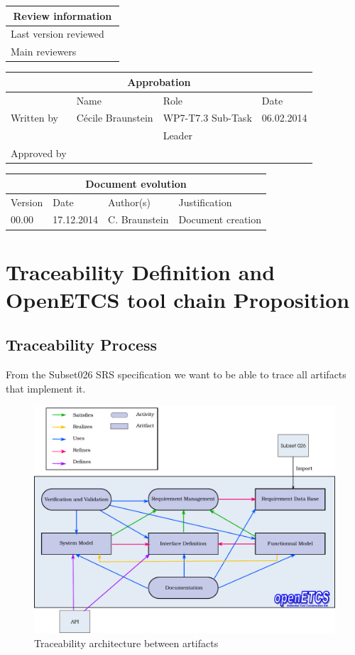 \documentclass[11pt]{template/openetcs_report}
\begin{document}
\begin{tabular}{|p{4.4cm}|p{8.7cm}|}
\hline
\multicolumn{2}{|c|}{Review information} \\
\hline
Last version reviewed &  \\
\hline
Main reviewers &  \\
\hline
\end{tabular}

\begin{tabular}{|p{2.2cm}|p{4cm}|p{4cm}|p{2cm}|}
\hline
\multicolumn{4}{|c|}{Approbation} \\
\hline
  &  Name & Role & Date   \\
\hline  
Written by    &  Cécile Braunstein & WP7-T7.3 Sub-Task  & 06.02.2014 \\
&  & Leader&\\
\hline
Approved by &  &   &  \\
\hline
\end{tabular}

\begin{tabular}{|p{2.2cm}|p{2cm}|p{3cm}|p{5cm}|}
\hline
\multicolumn{4}{|c|}{Document evolution} \\
\hline
Version &  Date & Author(s) & Justification  \\
\hline  
00.00 & 17.12.2014 & C. Braunstein  &  Document creation  \\


\hline  
\end{tabular}
\newpage
\mainmatter
\chapter{Traceability Definition and OpenETCS tool chain Proposition}

\section{Traceability Process}
\label{sec-1}
From the Subset026 SRS specification we want to be able to trace all artifacts
that implement it.
\begin{figure}[htb]
\centering
\includegraphics[width=.9\linewidth]{./images/trace_archi.pdf}
\caption{\label{fig:trace_process}Traceability architecture between artifacts}
\end{figure}
\end{document}
